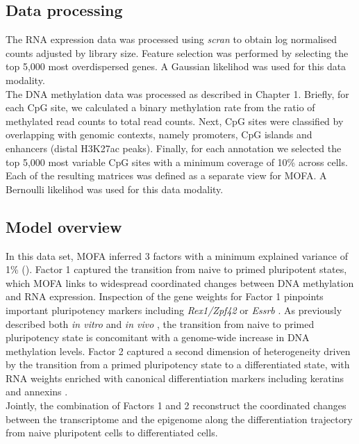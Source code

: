 \subsection{Data processing}

The RNA expression data was processed using \textit{scran}\cite{Lun2016b} to obtain log normalised counts adjusted by library size. Feature selection was performed by selecting the top 5,000 most overdispersed genes\cite{Lun2016a}. A Gaussian likelihod was used for this data modality. \\
The DNA methylation data was processed as described in Chapter 1. Briefly, for each CpG site, we calculated a binary methylation rate from the ratio of methylated read counts to total read counts. Next, CpG sites were classified by overlapping with genomic contexts, namely promoters, CpG islands and enhancers (distal H3K27ac peaks). Finally, for each annotation we selected the top 5,000 most variable CpG sites with a minimum coverage of 10\% across cells. Each of the resulting matrices was defined as a separate view for MOFA. A Bernoulli likelihod was used for this data modality.


\subsection{Model overview}

In this data set, MOFA inferred 3 factors with a minimum explained variance of 1\% (). Factor 1 captured the transition from naive to primed pluripotent states, which MOFA links to widespread coordinated changes between DNA methylation and RNA expression. Inspection of the gene weights for Factor 1 pinpoints important pluripotency markers including  \textit{Rex1/Zpf42} or \textit{Essrb} \cite{Mohammed2017}. As previously described both \textit{in vitro} \cite{Angermueller2016} and \textit{in vivo} \cite{Auclair2014}, the transition from naive to primed pluripotency state is concomitant with a genome-wide increase in DNA methylation levels. Factor 2 captured a second dimension of heterogeneity driven by the transition from a primed pluripotency state to a differentiated state, with RNA weights enriched with canonical differentiation markers including keratins and annexins \cite{Fuchs1988}.\\
Jointly, the combination of Factors 1 and 2 reconstruct the coordinated changes between the transcriptome and the epigenome along the differentiation trajectory from naive pluripotent cells to differentiated cells.

